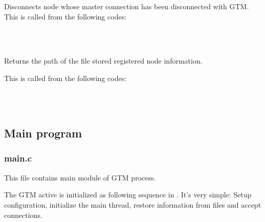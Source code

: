 	Disconnects node whose master connection has been disconnected with GTM.
	This is called from the following codes:

	\FuncRefHdr
	  \\
	  \\ \hline
	\FuncRefTrailor


	Returns the path of the file stored registered node information.

	This is called from the following codes:

	\FuncRefHdr
	  \\
	  \\ \hline
	\FuncRefTrailor





\subsection{Main program}



\subsubsection{main.c}

  This file contains main module of GTM process.

  The GTM active is initialized as following sequence in .
  It's very simple: Setup configuration, initialize the main thread, restore information
  from files and accept connections.

